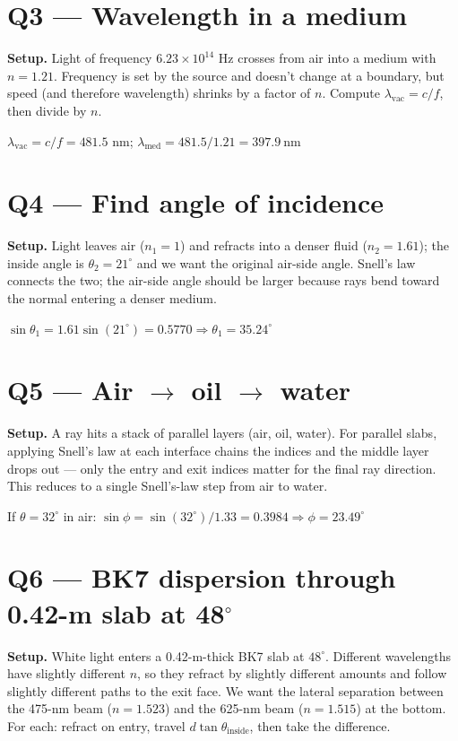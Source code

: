 \documentclass[11pt]{article}
\begin{document}
\section*{Q3 --- Wavelength in a medium}
\textbf{Setup.} Light of frequency $6.23\times10^{14}$ Hz crosses from air into a medium with $n=1.21$. Frequency is set by the source and doesn't change at a boundary, but speed (and therefore wavelength) shrinks by a factor of $n$. Compute $\lambda_{\text{vac}} = c/f$, then divide by $n$.

$\lambda_{\text{vac}} = c/f = 481.5$ nm; $\lambda_{\text{med}} = 481.5/1.21 = \boxed{397.9\ \text{nm}}$

\section*{Q4 --- Find angle of incidence}
\textbf{Setup.} Light leaves air ($n_1=1$) and refracts into a denser fluid ($n_2=1.61$); the inside angle is $\theta_2=21^\circ$ and we want the original air-side angle. Snell's law connects the two; the air-side angle should be larger because rays bend toward the normal entering a denser medium.

$\sin\theta_1 = 1.61\sin(21^\circ) = 0.5770 \Rightarrow \theta_1 = \boxed{35.24^\circ}$

\section*{Q5 --- Air $\to$ oil $\to$ water}
\textbf{Setup.} A ray hits a stack of parallel layers (air, oil, water). For parallel slabs, applying Snell's law at each interface chains the indices and the middle layer drops out --- only the entry and exit indices matter for the final ray direction. This reduces to a single Snell's-law step from air to water.

If $\theta = 32^\circ$ in air: $\sin\phi = \sin(32^\circ)/1.33 = 0.3984 \Rightarrow \phi = \boxed{23.49^\circ}$

\section*{Q6 --- BK7 dispersion through 0.42-m slab at 48$^\circ$}
\textbf{Setup.} White light enters a 0.42-m-thick BK7 slab at $48^\circ$. Different wavelengths have slightly different $n$, so they refract by slightly different amounts and follow slightly different paths to the exit face. We want the lateral separation between the 475-nm beam ($n=1.523$) and the 625-nm beam ($n=1.515$) at the bottom. For each: refract on entry, travel $d\tan\theta_{\text{inside}}$, then take the difference.
\end{document}
